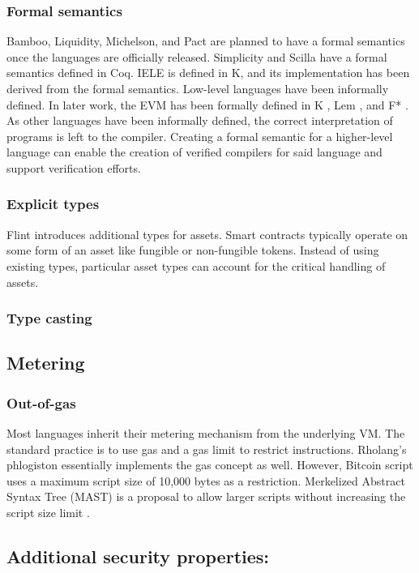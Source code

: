 \subsubsection{Formal semantics}
Bamboo, Liquidity, Michelson, and Pact are planned to have a formal semantics once the languages are officially released.  Simplicity and Scilla have a formal semantics defined in Coq. IELE is defined in K, and its implementation has been derived from the formal semantics.
Low-level languages have been informally defined. In later work, the EVM has been formally defined in K \cite{Hildenbrandt2017}, Lem \cite{Hirai2017}, and F* \cite{Grishchenko2018}.
As other languages have been informally defined, the correct interpretation of programs is left to the compiler. Creating a formal semantic for a higher-level language can enable the creation of verified compilers for said language and support verification efforts.

\subsubsection{Explicit types}
Flint introduces additional types for assets. Smart contracts typically operate on some form of an asset like fungible or non-fungible tokens. Instead of using existing types, particular asset types can account for the critical handling of assets.

\subsubsection{Type casting}


\subsection{Metering}
\subsubsection{Out-of-gas}

Most languages inherit their metering mechanism from the underlying VM. The standard practice is to use gas and a gas limit to restrict instructions. Rholang's phlogiston essentially implements the gas concept as well.
However, Bitcoin script uses a maximum script size of 10,000 bytes as a restriction. Merkelized Abstract Syntax Tree (MAST) is a proposal to allow larger scripts without increasing the script size limit \cite{Harding2017}.

\subsection{Additional security properties:} 
